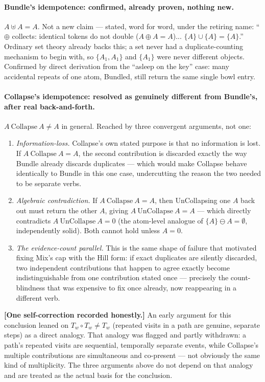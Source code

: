 \documentclass[11pt]{article}
\begin{document}
\paragraph{Bundle's idempotence: confirmed, already proven, nothing
new.} $A\uplus A=A$. Not a new claim --- stated, word for word, under
the retiring name: ``$\oplus$ collects: identical tokens do not
double ($A\oplus A=A$)... $\{A\}\cup\{A\}=\{A\}$.'' Ordinary set
theory already backs this; a set never had a duplicate-counting
mechanism to begin with, so $\{A_1,A_1\}$ and $\{A_1\}$ were never
different objects. Confirmed by direct derivation from the ``asleep
on the key'' case: many accidental repeats of one atom, Bundled,
still return the same single bowl entry.

\paragraph{Collapse's idempotence: resolved as genuinely different
from Bundle's, after real back-and-forth.} $A\ \text{Collapse}\ A \ne
A$ in general. Reached by three convergent arguments, not one:

\begin{enumerate}
\item \emph{Information-loss.} Collapse's own stated purpose is that
no information is lost. If $A\ \text{Collapse}\ A=A$, the second
contribution is discarded exactly the way Bundle already discards
duplicates --- which would make Collapse behave identically to
Bundle in this one case, undercutting the reason the two needed to be
separate verbs.
\item \emph{Algebraic contradiction.} If $A\ \text{Collapse}\ A=A$,
then UnCollapsing one $A$ back out must return the other $A$, giving
$A\ \text{UnCollapse}\ A=A$ --- which directly contradicts
$A\ \text{UnCollapse}\ A=0$ (the atom-level analogue of
$\{A\}\ominus A=\emptyset$, independently solid). Both cannot hold
unless $A=0$.
\item \emph{The evidence-count parallel.} This is the same shape of
failure that motivated fixing Mix's cap with the Hill form: if exact
duplicates are silently discarded, two independent contributions that
happen to agree exactly become indistinguishable from one
contribution stated once --- precisely the count-blindness that was
expensive to fix once already, now reappearing in a different verb.
\end{enumerate}

\textbf{[One self-correction recorded honestly.]} An early argument
for this conclusion leaned on $T_w\circ T_w\neq T_w$ (repeated visits
in a path are genuine, separate steps) as a direct analogy. That
analogy was flagged and partly withdrawn: a path's repeated visits
are sequential, temporally separate events, while Collapse's multiple
contributions are simultaneous and co-present --- not obviously the
same kind of multiplicity. The three arguments above do not depend on
that analogy and are treated as the actual basis for the conclusion.
\end{document}
